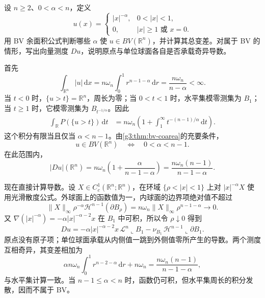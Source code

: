 \begin{exercise}\label{g3:ex:radial-singularity-bv}
	设 \(n\ge2\)、\(0<\alpha<n\)，定义
	\[
		u(x)=\begin{cases}|x|^{-\alpha},&0<|x|<1,\\0,&|x|\ge1\text{ 或 }x=0.\end{cases}
	\]
	用 BV 余面积公式判断哪些 \(\alpha\) 使 \(u\in BV(\mathbb R^n)\)，并计算其总变差。对属于 BV 的情形，写出向量测度 \(Du\)，说明原点与单位球面各自是否承载奇异导数。
\end{exercise}
\begin{solution}
	首先
	\[
		\int_{\mathbb R^n}|u|\,\mathrm dx
		=n\omega_n\int_0^1r^{n-1-\alpha}\,\mathrm dr
		=\frac{n\omega_n}{n-\alpha}<\infty.
	\]
	当 \(t<0\) 时，\(\{u>t\}=\mathbb R^n\)，周长为零；当 \(0<t<1\) 时，水平集模零测集为 \(B_1\)；当 \(t\ge1\) 时，它模零测集为 \(B_{t^{-1/\alpha}}\)。因此
	\[
	\begin{aligned}
		\int_{\mathbb R}P(\{u>t\})\,\mathrm dt
		&=n\omega_n\left(1+\int_1^\infty t^{-(n-1)/\alpha}\,\mathrm dt\right).
	\end{aligned}
	\]
	这个积分有限当且仅当 \(\alpha<n-1\)。由\cref{g3:thm:bv-coarea}的充要条件，
	\[
		u\in BV(\mathbb R^n)\quad\Longleftrightarrow\quad0<\alpha<n-1.
	\]
	在此范围内，
	\[
		|Du|(\mathbb R^n)
		=n\omega_n\left(1+\frac{\alpha}{n-1-\alpha}\right)
		=\frac{n\omega_n(n-1)}{n-1-\alpha}.
	\]

	现在直接计算导数。设 \(X\in C_c^1(\mathbb R^n;\mathbb R^n)\)，在环域 \(\{\rho<|x|<1\}\) 上对 \(|x|^{-\alpha}X\) 使用光滑散度公式。外球面上的函数值为一，内球面的边界项绝对值不超过
	\[
		\|X\|_\infty\rho^{-\alpha}\mathcal H^{n-1}(\partial B_\rho)
		=n\omega_n\|X\|_\infty\rho^{n-1-\alpha}\longrightarrow0.
	\]
	又 \(\nabla(|x|^{-\alpha})=-\alpha|x|^{-\alpha-2}x\) 在 \(B_1\) 中可积，所以令 \(\rho\downarrow0\) 得到
	\[
		Du=-\alpha|x|^{-\alpha-2}x\,\mathcal L^n\!\llcorner B_1
		-\nu_{B_1}\,\mathcal H^{n-1}\!\llcorner\partial B_1.
	\]
	原点没有原子项；单位球面承载从内侧值一跳到外侧值零所产生的导数。两个测度互相奇异，其变差相加为
	\[
		\alpha n\omega_n\int_0^1r^{n-2-\alpha}\,\mathrm dr+n\omega_n
		=\frac{n\omega_n(n-1)}{n-1-\alpha},
	\]
	与水平集计算一致。当 \(n-1\le\alpha<n\) 时，函数仍可积，但水平集周长的积分发散，因而不属于 BV。
\end{solution}

